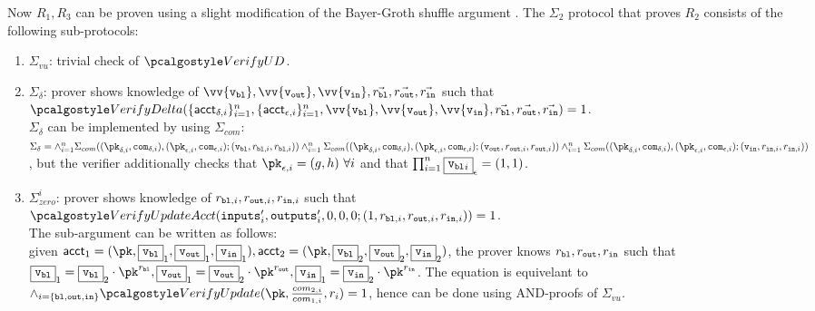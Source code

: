 Now $R_1, R_3$ can be proven using a slight modification of the Bayer-Groth shuffle argument \cite{Bayer-GrothShuffle}.
The $\Sigma_2$ protocol that proves $R_2$ consists of the following sub-protocols:
\begin{enumerate}
    \item $\Sigma_{vu}$: trivial check of $\verupddelta$.
    
    \item $\Sigma_{\delta}$: prover shows knowledge of $\vv{\vbl}, \vv{\vout}, \vv{\vin}, \vec{r_{\varbl}}, \vec{r_{\varout}}, \vec{r_{\varin}}$ such that \\
     $\verdelta(\{\acct_{\delta,i}\}_{i=1}^{n}, \{\acct_{\epsilon,i}\}_{i=1}^{n}, \vv{\vbl}, \vv{\vout}, \vv{\vin}, \vec{r_{\varbl}}, \vec{r_{\varout}}, \vec{r_{\varin}}) = 1$. \\
     $\Sigma_{\delta}$ can be implemented by using $\Sigma_{com}$: \\
     $\Sigma_{\delta} = \land_{i=1}^n \Sigma_{com}((\pk_{\delta,i}, \com_{\delta,i}), (\pk_{\epsilon,i}, \com_{\epsilon,i}); (\vbl, r_{\varbl,i}, r_{\varbl,i})) \\
     \land_{i=1}^n \Sigma_{com}((\pk_{\delta,i}, \com_{\delta,i}), (\pk_{\epsilon,i}, \com_{\epsilon,i}); (\vout, r_{\varout,i}, r_{\varout,i})) \\
     \land_{i=1}^n \Sigma_{com}((\pk_{\delta,i}, \com_{\delta,i}), (\pk_{\epsilon,i}, \com_{\epsilon,i}); (\vin, r_{\varin,i}, r_{\varin,i}))$
     , but the verifier additionally checks that $\pk_{\epsilon,i} = (g,h) \ \forall i$ and that $\prod_{i=1}^n \fbox{${\textup{\texttt{{v}}}_{\textup{\texttt{{bl}}}}}_i$}_{\epsilon} = (1,1)$.

     \item $\Sigma^{i}_{zero}$: prover shows knowledge of $r_{\textup{\texttt{{bl}}},i}, r_{\textup{\texttt{{out}}},i}, r_{\textup{\texttt{{in}}},i}$ such that \\ 
     $\verupdacc(\inputs'_i, \outputs'_i, 0,0,0;(1, r_{\varbl,i}, r_{\varout,i}, r_{\varin,i})) = 1$. \\ 
     The sub-argument can be written as follows: \\
     given $\acct_1 = (\pk, \comm{\vbl}_1, \comm{\vout}_1, \comm{\vin}_1), \acct_2 = (\pk, \comm{\vbl}_2, \comm{\vout}_2, \comm{\vin}_2)$, the prover knows $r_{\textup{\texttt{{bl}}}}, r_{\textup{\texttt{{out}}}}, r_{\textup{\texttt{{in}}}}$ such that $\comm{\vbl}_1 = \comm{\vbl}_2 \cdot \pk^{r_{\varbl}}, \comm{\vout}_1 = \comm{\vout}_2 \cdot \pk^{r_{\varout}}, \comm{\vin}_1 = \comm{\vin}_2 \cdot \pk^{r_{\varin}}$. The equation is equivelant to $\land_{i=\{\varbl, \varout, \varin\}}\verupd(\pk, \frac{com_{2,i}}{com_{1,i}}, r_i) = 1$, hence can be done using AND-proofs of $\Sigma_{vu}$. 


\end{enumerate}
